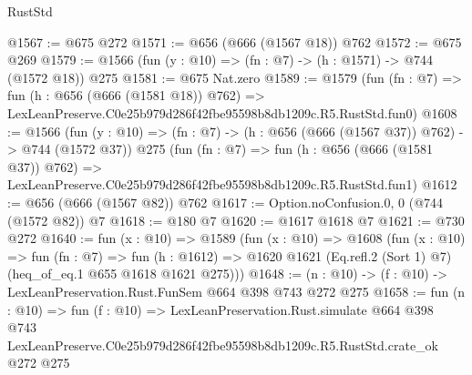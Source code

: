 \begin{lexlean}{RustStd}
\begin{coremodule}
@1567 := @675 @272
@1571 := @656 (@666 (@1567 @18)) @762
@1572 := @675 @269
@1579 := @1566 (fun (y : @10) => (fn : @7) -> (h : @1571) -> @744 (@1572 @18)) @275
@1581 := @675 Nat.zero
@1589 := @1579
    (fun (fn : @7) =>
    fun (h : @656 (@666 (@1581 @18)) @762) =>
    LexLeanPreserve.C0e25b979d286f42fbe95598b8db1209c.R5.RustStd.fun0)
@1608 := @1566
    (fun (y : @10) => (fn : @7) -> (h : @656 (@666 (@1567 @37)) @762) -> @744 (@1572 @37))
    @275
    (fun (fn : @7) =>
    fun (h : @656 (@666 (@1581 @37)) @762) =>
    LexLeanPreserve.C0e25b979d286f42fbe95598b8db1209c.R5.RustStd.fun1)
@1612 := @656 (@666 (@1567 @82)) @762
@1617 := Option.noConfusion.{0, 0} (@744 (@1572 @82)) @7
@1618 := @180 @7
@1620 := @1617 @1618 @7
@1621 := @730 @272
@1640 := fun (x : @10) =>
  @1589
    (fun (x : @10) =>
    @1608
      (fun (x : @10) =>
      fun (fn : @7) =>
      fun (h : @1612) =>
      @1620 @1621 (Eq.refl.{2} (Sort 1) @7) (heq_of_eq.{1} @655 @1618 @1621 @275)))
@1648 := (n : @10) -> (f : @10) -> LexLeanPreservation.Rust.FunSem @664 @398 @743 @272 @275
@1658 := fun (n : @10) =>
  fun (f : @10) =>
  LexLeanPreservation.Rust.simulate
    @664
    @398
    @743
    LexLeanPreserve.C0e25b979d286f42fbe95598b8db1209c.R5.RustStd.crate_ok
    @272
    @275
\end{coremodule}
\end{lexlean}
